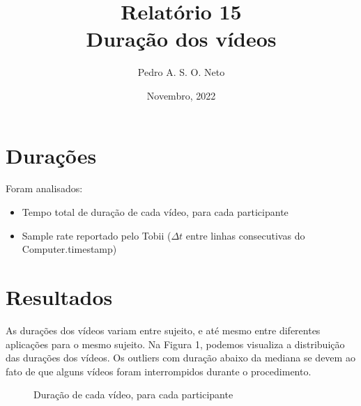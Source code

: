 \documentclass{article}
\title{Relatório 15 \\ Duração dos vídeos}
\author{Pedro A. S. O. Neto}
\date{Novembro, 2022}
\begin{document}
\maketitle

\section{Durações}

Foram analisados:

\begin{itemize}
  \item Tempo total de duração de cada vídeo, para cada participante
  \item Sample rate reportado pelo Tobii ($\Delta t$ entre linhas consecutivas do Computer.timestamp)
\end{itemize}

\section{Resultados}

As durações dos vídeos variam entre sujeito, e até mesmo entre diferentes aplicações para o mesmo sujeito. Na Figura 1, podemos visualiza a distribuição das durações dos vídeos. Os outliers com duração abaixo da mediana se devem ao fato de que alguns vídeos foram interrompidos durante o procedimento.

\begin{figure}[]
  \caption{Duração de cada vídeo, para cada participante}
  \noindent{}
  \centering
\end{figure}
\end{document}
